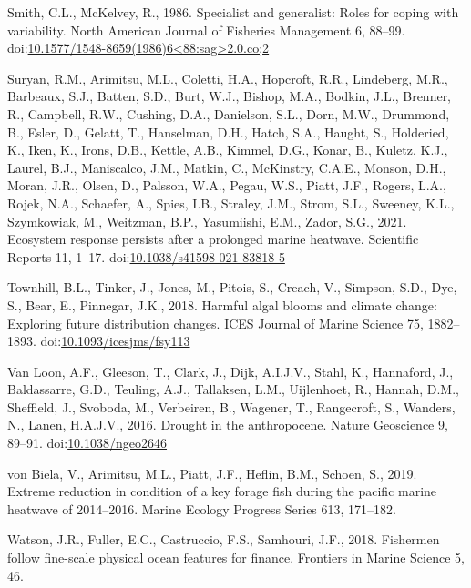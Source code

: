 \documentclass[]{elsarticle} %
\begin{document}
\leavevmode\hypertarget{ref-Smith1986}{}%
Smith, C.L., McKelvey, R., 1986. Specialist and generalist: Roles for
coping with variability. North American Journal of Fisheries Management
6, 88--99.
doi:\href{https://doi.org/10.1577/1548-8659(1986)6\%3C88:sag\%3E2.0.co;2}{10.1577/1548-8659(1986)6\textless88:sag\textgreater2.0.co;2}

\leavevmode\hypertarget{ref-Suryan2021}{}%
Suryan, R.M., Arimitsu, M.L., Coletti, H.A., Hopcroft, R.R., Lindeberg,
M.R., Barbeaux, S.J., Batten, S.D., Burt, W.J., Bishop, M.A., Bodkin,
J.L., Brenner, R., Campbell, R.W., Cushing, D.A., Danielson, S.L., Dorn,
M.W., Drummond, B., Esler, D., Gelatt, T., Hanselman, D.H., Hatch, S.A.,
Haught, S., Holderied, K., Iken, K., Irons, D.B., Kettle, A.B., Kimmel,
D.G., Konar, B., Kuletz, K.J., Laurel, B.J., Maniscalco, J.M., Matkin,
C., McKinstry, C.A.E., Monson, D.H., Moran, J.R., Olsen, D., Palsson,
W.A., Pegau, W.S., Piatt, J.F., Rogers, L.A., Rojek, N.A., Schaefer, A.,
Spies, I.B., Straley, J.M., Strom, S.L., Sweeney, K.L., Szymkowiak, M.,
Weitzman, B.P., Yasumiishi, E.M., Zador, S.G., 2021. Ecosystem response
persists after a prolonged marine heatwave. Scientific Reports 11,
1--17.
doi:\href{https://doi.org/10.1038/s41598-021-83818-5}{10.1038/s41598-021-83818-5}

\leavevmode\hypertarget{ref-Townhill2018}{}%
Townhill, B.L., Tinker, J., Jones, M., Pitois, S., Creach, V., Simpson,
S.D., Dye, S., Bear, E., Pinnegar, J.K., 2018. Harmful algal blooms and
climate change: Exploring future distribution changes. ICES Journal of
Marine Science 75, 1882--1893.
doi:\href{https://doi.org/10.1093/icesjms/fsy113}{10.1093/icesjms/fsy113}

\leavevmode\hypertarget{ref-VanLoon2016}{}%
Van Loon, A.F., Gleeson, T., Clark, J., Dijk, A.I.J.V., Stahl, K.,
Hannaford, J., Baldassarre, G.D., Teuling, A.J., Tallaksen, L.M.,
Uijlenhoet, R., Hannah, D.M., Sheffield, J., Svoboda, M., Verbeiren, B.,
Wagener, T., Rangecroft, S., Wanders, N., Lanen, H.A.J.V., 2016. Drought
in the anthropocene. Nature Geoscience 9, 89--91.
doi:\href{https://doi.org/10.1038/ngeo2646}{10.1038/ngeo2646}

\leavevmode\hypertarget{ref-VonBiela2019}{}%
von Biela, V., Arimitsu, M.L., Piatt, J.F., Heflin, B.M., Schoen, S.,
2019. Extreme reduction in condition of a key forage fish during the
pacific marine heatwave of 2014--2016. Marine Ecology Progress Series
613, 171--182.

\leavevmode\hypertarget{ref-Watson2018}{}%
Watson, J.R., Fuller, E.C., Castruccio, F.S., Samhouri, J.F., 2018.
Fishermen follow fine-scale physical ocean features for finance.
Frontiers in Marine Science 5, 46.
\end{document}
